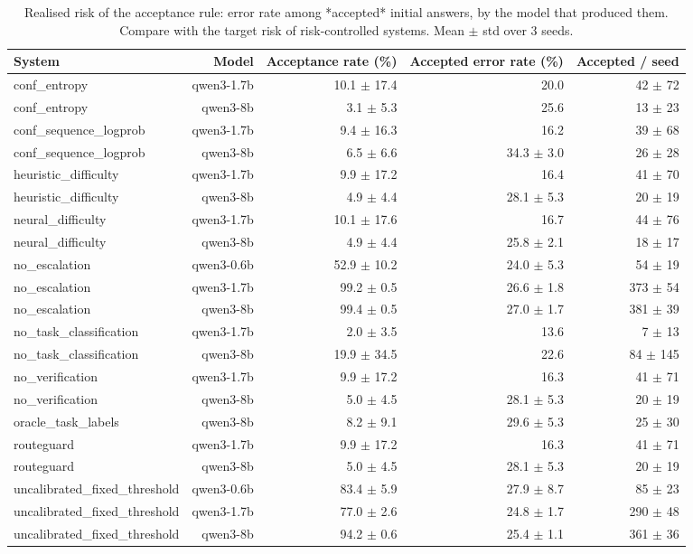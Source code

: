 \begin{table}[t]
\centering
\small
\caption{Realised risk of the acceptance rule: error rate among *accepted* initial answers, by the model that produced them. Compare with the target risk of risk-controlled systems. Mean $\pm$ std over 3 seeds.}
\label{tab:acceptance}
\begin{tabular}{lrrrr}
\toprule
System & Model & Acceptance rate (\%) & Accepted error rate (\%) & Accepted / seed \\
\midrule
conf\_entropy & qwen3-1.7b & 10.1 $\pm$ 17.4 & 20.0 & 42 $\pm$ 72 \\
conf\_entropy & qwen3-8b & 3.1 $\pm$ 5.3 & 25.6 & 13 $\pm$ 23 \\
conf\_sequence\_logprob & qwen3-1.7b & 9.4 $\pm$ 16.3 & 16.2 & 39 $\pm$ 68 \\
conf\_sequence\_logprob & qwen3-8b & 6.5 $\pm$ 6.6 & 34.3 $\pm$ 3.0 & 26 $\pm$ 28 \\
heuristic\_difficulty & qwen3-1.7b & 9.9 $\pm$ 17.2 & 16.4 & 41 $\pm$ 70 \\
heuristic\_difficulty & qwen3-8b & 4.9 $\pm$ 4.4 & 28.1 $\pm$ 5.3 & 20 $\pm$ 19 \\
neural\_difficulty & qwen3-1.7b & 10.1 $\pm$ 17.6 & 16.7 & 44 $\pm$ 76 \\
neural\_difficulty & qwen3-8b & 4.9 $\pm$ 4.4 & 25.8 $\pm$ 2.1 & 18 $\pm$ 17 \\
no\_escalation & qwen3-0.6b & 52.9 $\pm$ 10.2 & 24.0 $\pm$ 5.3 & 54 $\pm$ 19 \\
no\_escalation & qwen3-1.7b & 99.2 $\pm$ 0.5 & 26.6 $\pm$ 1.8 & 373 $\pm$ 54 \\
no\_escalation & qwen3-8b & 99.4 $\pm$ 0.5 & 27.0 $\pm$ 1.7 & 381 $\pm$ 39 \\
no\_task\_classification & qwen3-1.7b & 2.0 $\pm$ 3.5 & 13.6 & 7 $\pm$ 13 \\
no\_task\_classification & qwen3-8b & 19.9 $\pm$ 34.5 & 22.6 & 84 $\pm$ 145 \\
no\_verification & qwen3-1.7b & 9.9 $\pm$ 17.2 & 16.3 & 41 $\pm$ 71 \\
no\_verification & qwen3-8b & 5.0 $\pm$ 4.5 & 28.1 $\pm$ 5.3 & 20 $\pm$ 19 \\
oracle\_task\_labels & qwen3-8b & 8.2 $\pm$ 9.1 & 29.6 $\pm$ 5.3 & 25 $\pm$ 30 \\
routeguard & qwen3-1.7b & 9.9 $\pm$ 17.2 & 16.3 & 41 $\pm$ 71 \\
routeguard & qwen3-8b & 5.0 $\pm$ 4.5 & 28.1 $\pm$ 5.3 & 20 $\pm$ 19 \\
uncalibrated\_fixed\_threshold & qwen3-0.6b & 83.4 $\pm$ 5.9 & 27.9 $\pm$ 8.7 & 85 $\pm$ 23 \\
uncalibrated\_fixed\_threshold & qwen3-1.7b & 77.0 $\pm$ 2.6 & 24.8 $\pm$ 1.7 & 290 $\pm$ 48 \\
uncalibrated\_fixed\_threshold & qwen3-8b & 94.2 $\pm$ 0.6 & 25.4 $\pm$ 1.1 & 361 $\pm$ 36 \\
\bottomrule
\end{tabular}
\end{table}
